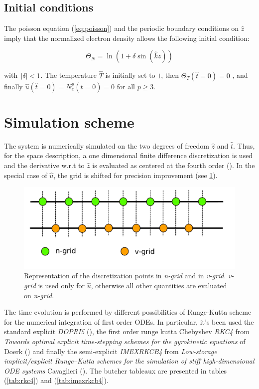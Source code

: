 \documentclass[final]{jpp}
\DeclarePairedDelimiter\abs{\lvert}{\rvert}
\begin{document}
\subsection{Initial conditions}

The poisson equation (\ref{eq:poisson}) and the periodic boundary conditions on $\hat{z}$ imply that the normalized electron density allows the following initial condition:

\begin{equation}
    \Theta_N = \ln(1 + \delta \sin(\hat{k} \hat{z}))
\end{equation}

with $\abs{\delta} < 1$. The temperature $\hat{T}$ is initially set to $1$, then $\Theta_T(\hat{t} = 0) = 0$ , and finally $\hat{u}(\hat{t} = 0) = N_e^p(\hat{t} = 0) = 0$ for all $p \ge 3$. 

\section{Simulation scheme}

The system is numerically simulated on the two degrees of freedom $\hat{z}$ and $\hat{t}$. Thus, for the space description, a one dimensional finite difference discretization is used and the derivative w.r.t to $\hat{z}$ is evaluated as centered at the fourth order (\cite{fdwiki}).  In the special case of $\hat{u}$, the grid is shifted for precision improvement (see \ref{fig:grids}).

\begin{figure}
\centering
\includegraphics[width=\textwidth]{grid.pdf}
\caption{Representation of the discretization points in \textit{n-grid} and in \textit{v-grid}. \textit{v-grid} is used only for $\hat{u}$, otherwise all other quantities are evaluated on \textit{n-grid}.}
\label{fig:grids}
\end{figure}

The time evolution is performed by different possibilities of Runge-Kutta scheme for the numerical integration of first order ODEs. In particular, it's been used the standard explicit \textit{DOPRI5} (\cite{springer}), the first order runge kutta Chebyshev \textit{RKC4} from \textit{Towards optimal explicit time-stepping schemes for the gyrokinetic equations} of Doerk (\cite{doerk}) and finally the semi-explicit \textit{IMEXRKCB4} from \textit{Low-storage implicit/explicit Runge–Kutta schemes for the
simulation of stiff high-dimensional ODE systems} Cavaglieri (\cite{lowstorageimex}). The butcher tableaux are presented in tables (\ref{tab:rkc4}) and (\ref{tab:imexrkcb4}).
\end{document}
